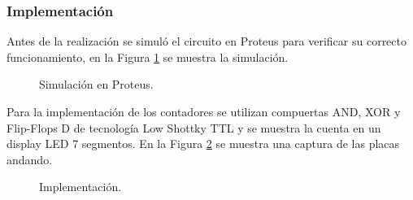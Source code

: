 \subsubsection{Implementaci\'on}
\noindent
Antes de la realizaci\'on se simul\'o el circuito en Proteus para verificar su correcto funcionamiento, en la Figura \ref{ej7_fig:sim_proteus} se muestra la simulaci\'on.
%
\begin{figure}[H]
	\centering
	\caption{Simulaci\'on en Proteus.}
	\label{ej7_fig:sim_proteus}
\end{figure}
%
\noindent
Para la implementaci\'on de los contadores se utilizan compuertas AND, XOR y Flip-Flops D de tecnolog\'ia Low Shottky TTL y se muestra la cuenta en un display LED 7 segmentos. En la Figura \ref{ej7_fig:placa_andando} se muestra una captura de las placas andando.
%
\begin{figure}[H]
	\centering
	\caption{Implementaci\'on.}
	\label{ej7_fig:placa_andando}
\end{figure}
%
